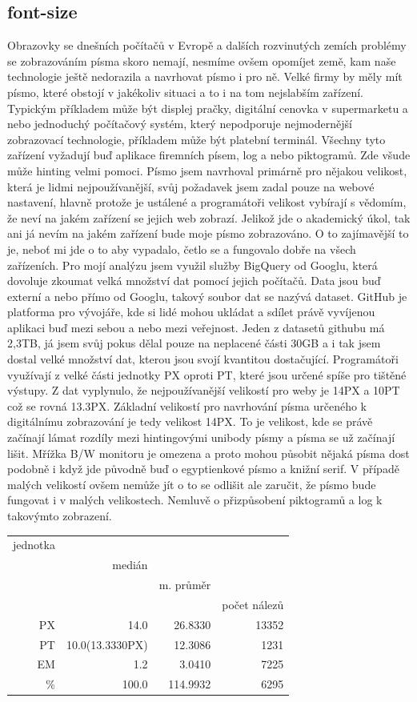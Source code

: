 \documentclass[a4paper]{article}
\begin{document}
\subsection{font-size}
Obrazovky se dnešních počítačů v Evropě a dalších rozvinutých zemích problémy se zobrazováním písma skoro nemají, nesmíme ovšem opomíjet země, kam naše technologie ještě nedorazila a navrhovat písmo i pro ně. Velké firmy by měly mít písmo, které obstojí v jakékoliv situaci a to i na tom nejslabším zařízení. Typickým příkladem může být displej pračky, digitální cenovka v supermarketu a nebo jednoduchý počítačový systém, který nepodporuje nejmodernější zobrazovací technologie, příkladem může být platební terminál. Všechny tyto zařízení vyžadují buď aplikace firemních písem, log a nebo piktogramů. Zde všude může hinting velmi pomoci. Písmo jsem navrhoval primárně pro nějakou velikost, která je lidmi nejpoužívanější, svůj požadavek jsem zadal pouze na webové nastavení, hlavně protože je ustálené a programátoři velikost vybírají s vědomím, že neví na jakém zařízení se jejich web zobrazí. Jelikož jde o akademický úkol, tak ani já nevím na jakém zařízení bude moje písmo zobrazováno. O to zajímavější to je, neboť mi jde o to aby vypadalo, četlo se a fungovalo dobře na všech zařízeních. Pro mojí analýzu jsem využil služby BigQuery od Googlu, která dovoluje zkoumat velká množství dat pomocí jejich počítačů. Data jsou buď externí a nebo přímo od Googlu, takový soubor dat se nazývá dataset. GitHub je platforma pro vývojáře, kde si lidé mohou ukládat a sdílet právě vyvíjenou aplikaci buď mezi sebou a nebo mezi veřejnost. Jeden z datasetů githubu má 2,3TB, já jsem svůj pokus dělal pouze na neplacené části 30GB a i tak jsem dostal velké množství dat, kterou jsou svojí kvantitou dostačující. Programátoři využívají z velké části jednotky PX oproti PT, které jsou určené spíše pro tištěné výstupy. Z dat vyplynulo, že nejpoužívanější velikostí pro weby je 14PX a 10PT což se rovná 13.3PX. Základní velikostí pro navrhování písma určeného k digitálnímu zobrazování je tedy velikost 14PX. To je velikost, kde se právě začínají lámat rozdíly mezi hintingovými unibody písmy a písma se už začínají lišit. Mřížka B/W monitoru je omezena a proto mohou působit nějaká písma dost podobně i když jde původně buď o egyptienkové písmo a knižní serif. V případě malých velikostí ovšem nemůže jít o to se odlišit ale zaručit, že písmo bude fungovat i v malých velikostech. Nemluvě o přizpůsobení piktogramů a log k takovýmto zobrazení.

\begin{tabular}{r|rrr}
jednotka & \\
& medián & \\
& & m. průměr & \\
& & & počet nálezů\\
\midrule
PX & 14.0 & 26.8330 &13352 \\
PT & 10.0(13.3330PX)  & 12.3086 & 1231 \\
EM & 1.2 & 3.0410 & 7225 \\
\% & 100.0 & 114.9932 & 6295\\
\end{tabular}
\end{document}
